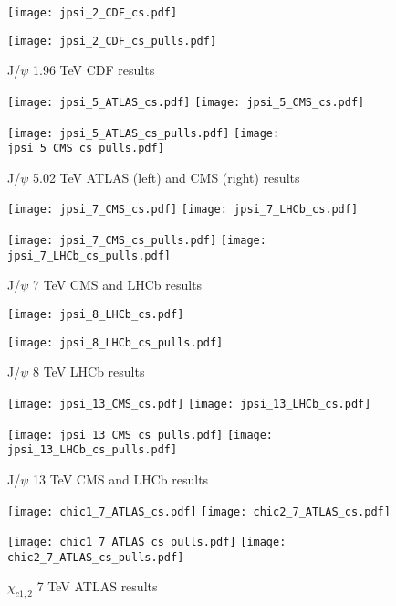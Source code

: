 \documentclass{article}
\begin{document}

\begin{figure}
\centering
\texttt{[image: jpsi\_2\_CDF\_cs.pdf]}

\texttt{[image: jpsi\_2\_CDF\_cs\_pulls.pdf]}
\caption{J/$\psi$ 1.96 TeV CDF results}
\end{figure}

\clearpage

\begin{figure}
\centering
\texttt{[image: jpsi\_5\_ATLAS\_cs.pdf]}
\texttt{[image: jpsi\_5\_CMS\_cs.pdf]}

\texttt{[image: jpsi\_5\_ATLAS\_cs\_pulls.pdf]}
\texttt{[image: jpsi\_5\_CMS\_cs\_pulls.pdf]}
\caption{J/$\psi$ 5.02 TeV ATLAS (left) and CMS (right) results}
\end{figure}

\clearpage

\begin{figure}
\centering
\texttt{[image: jpsi\_7\_CMS\_cs.pdf]}
\texttt{[image: jpsi\_7\_LHCb\_cs.pdf]}

\texttt{[image: jpsi\_7\_CMS\_cs\_pulls.pdf]}
\texttt{[image: jpsi\_7\_LHCb\_cs\_pulls.pdf]}
\caption{J/$\psi$ 7 TeV CMS and LHCb results}
\end{figure}

\clearpage

\begin{figure}
\centering
\texttt{[image: jpsi\_8\_LHCb\_cs.pdf]}

\texttt{[image: jpsi\_8\_LHCb\_cs\_pulls.pdf]}
\caption{J/$\psi$ 8 TeV LHCb results}
\end{figure}

\clearpage

\begin{figure}
\centering
\texttt{[image: jpsi\_13\_CMS\_cs.pdf]}
\texttt{[image: jpsi\_13\_LHCb\_cs.pdf]}

\texttt{[image: jpsi\_13\_CMS\_cs\_pulls.pdf]}
\texttt{[image: jpsi\_13\_LHCb\_cs\_pulls.pdf]}
\caption{J/$\psi$ 13 TeV CMS and LHCb results}
\end{figure}

\clearpage

\begin{figure}
\centering
\texttt{[image: chic1\_7\_ATLAS\_cs.pdf]}
\texttt{[image: chic2\_7\_ATLAS\_cs.pdf]}

\texttt{[image: chic1\_7\_ATLAS\_cs\_pulls.pdf]}
\texttt{[image: chic2\_7\_ATLAS\_cs\_pulls.pdf]}
\caption{$\chi_{c1,2}$ 7 TeV ATLAS results}
\end{figure}
\end{document}
